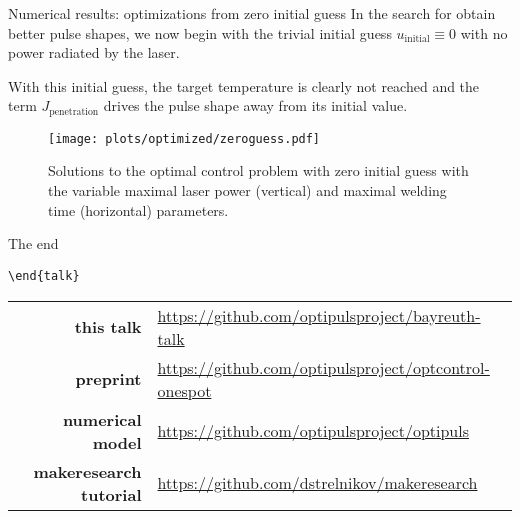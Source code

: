 \documentclass[
	9pt,
	hyperref = {unicode,pdfpagelabels=false},
	notheorems,
	aspectratio=169
	]{beamer}
\begin{document}
\begin{frame}{Numerical results: optimizations from zero initial guess}
	In the search for obtain better pulse shapes, we now begin with the trivial initial guess $u_\text{initial} \equiv 0$ with no power radiated by the laser.

	With this initial guess, the target temperature is clearly not reached and the term $J_\text{penetration}$ drives the pulse shape away from its initial value.
	
	\begin{table}
		\centering
		
		\caption{Numerical report on the series of optimizations with zero initial guess.}
		\label{tab:zeroguess}
	\end{table}
\end{frame}


\begin{frame}
	\vspace{-0.75em}
	\begin{figure}
		\centering
		\texttt{[image: plots/optimized/zeroguess.pdf]}
		\vspace{-1.0em}
		\caption{Solutions to the optimal control problem with zero initial guess with the variable maximal laser power (vertical) and maximal welding time (horizontal) parameters.}
		\label{fig:zeroguess}
	\end{figure}
\end{frame}


\begin{frame}{The end}
	\begin{center}
		\texttt{{\textbackslash}end\{talk\}}\\[1em]
		\vfill
		\begin{tabular}{rl}
			\textbf{this talk} & \url{https://github.com/optipulsproject/bayreuth-talk} \\
			\textbf{preprint} & \url{https://github.com/optipulsproject/optcontrol-onespot} \\
			\textbf{numerical model} & \url{https://github.com/optipulsproject/optipuls} \\
			\textbf{makeresearch tutorial} & \url{https://github.com/dstrelnikov/makeresearch}
		\end{tabular}
	\end{center}
\end{frame}
\end{document}

